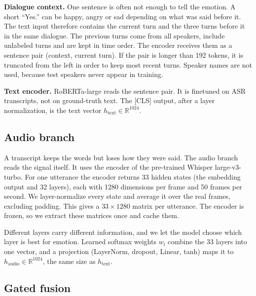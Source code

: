 \documentclass[conference]{IEEEtran}
\begin{document}
\textbf{Dialogue context.} One sentence is often not enough to tell the emotion. A short ``Yes.'' can be happy, angry
or sad depending on what was said before it. The text input therefore contains the current turn and the three turns
before it in the same dialogue. The previous turns come from all speakers, include unlabeled turns
and are kept in time order. The encoder receives them as a sentence pair (context, current turn). If the pair is
longer than 192 tokens, it is truncated from the left in order to keep most recent turns. Speaker names are not used,
because test speakers never appear in training.

\textbf{Text encoder.} RoBERTa-large \cite{liu2019roberta} reads the sentence pair. It is finetuned on ASR
transcripts, not on ground-truth text. The [CLS] output, after a layer normalization, is the text vector
$h_{\text{text}} \in \mathbb{R}^{1024}$.

\subsection{Audio branch}

A transcript keeps the words but loses how they were said. The audio branch reads the signal itself. It uses the
encoder of the pre-trained Whisper large-v3-turbo. For one utterance the encoder returns 33 hidden
states (the embedding output and 32 layers), each with 1280 dimensions per frame and 50 frames per second. We
layer-normalize every state and average it over the real frames, excluding padding. This gives a $33 \times 1280$
matrix per utterance. The encoder is frozen, so we extract these matrices once and cache them.

Different layers carry different information, and we let the model choose which layer is best for emotion. Learned softmax weights $w_l$ combine the 33 layers into one vector, and a projection
(LayerNorm, dropout, Linear, tanh) maps it to $h_{\text{audio}} \in \mathbb{R}^{1024}$, the same size as
$h_{\text{text}}$.

\subsection{Gated fusion}
\end{document}
